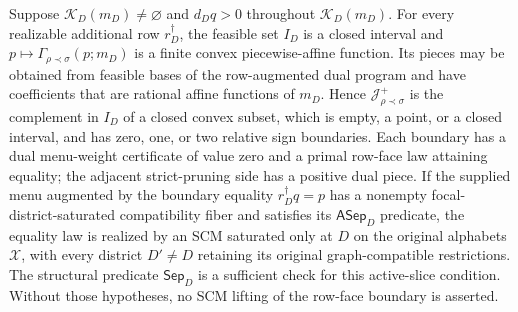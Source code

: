 Suppose \(\mathcal K_D(m_D)\ne\varnothing\) and \(d_Dq>0\) throughout \(\mathcal K_D(m_D)\). For every realizable additional row \(r_D^\dagger\), the feasible set \(I_D\) is a closed interval and \(p\mapsto\Gamma_{\rho\prec\sigma}(p;m_D)\) is a finite convex piecewise-affine function. Its pieces may be obtained from feasible bases of the row-augmented dual program and have coefficients that are rational affine functions of \(m_D\). Hence \(\mathcal J_{\rho\prec\sigma}^+\) is the complement in \(I_D\) of a closed convex subset, which is empty, a point, or a closed interval, and has zero, one, or two relative sign boundaries. Each boundary has a dual menu-weight certificate of value zero and a primal row-face law attaining equality; the adjacent strict-pruning side has a positive dual piece. If the supplied menu augmented by the boundary equality \(r_D^\dagger q=p\) has a nonempty focal-district-saturated compatibility fiber and satisfies its \(\mathsf{ASep}_D\) predicate, the equality law is realized by an SCM saturated only at \(D\) on the original alphabets \(\mathcal X\), with every district \(D'\ne D\) retaining its original graph-compatible restrictions. The structural predicate \(\mathsf{Sep}_D\) is a sufficient check for this active-slice condition. Without those hypotheses, no SCM lifting of the row-face boundary is asserted.
